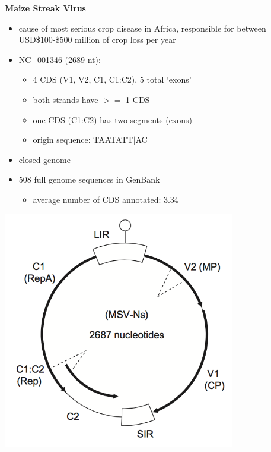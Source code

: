 \documentclass[landscape]{slides}
\begin{document}
\begin{slide}
\begin{center}
\textbf{Maize Streak Virus}

\begin{minipage}[c]{6in}
\tiny
\begin{itemize}
\item cause of most serious crop disease in Africa, responsible for
  between USD\$100-\$500 million of crop loss per year
\item NC\_001346 (2689 nt):
  \begin{itemize}
    \item 4 CDS (V1, V2, C1, C1:C2), 5 total ‘exons’
    \item both strands have $>=$ 1 CDS
    \item one CDS (C1:C2) has two segments (exons)
    \item origin sequence: TAATATT$|$AC
  \end{itemize}
\item closed genome
\item 508 full genome sequences in GenBank
\begin{itemize}
  \item average number of CDS annotated: 3.34
\end{itemize}
\end{itemize}
\vspace{3in}
\end{minipage}
\begin{minipage}[c]{4in}
\includegraphics[width=4in]{figs/msv-genome-small}
\vspace{3in}
\end{minipage}

\vfill
\end{center}
\end{slide}
\end{document}
